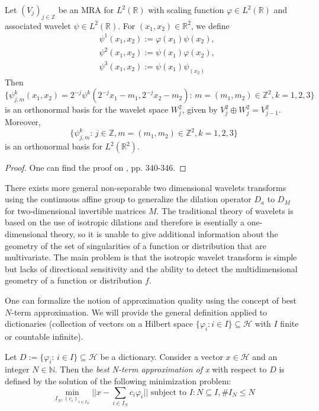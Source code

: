 \begin{thm}
Let $(V_j)_{j\in\mathbb{Z}}$ be an MRA for $L^2(\mathbb{R})$ with scaling function $\varphi\in L^2(\mathbb{R})$ and associated wavelet $\psi\in L^2(\mathbb{R})$. For $(x_1,x_2)\in\mathbb{R}^2$, we define
$$
\begin{aligned}
&\psi^1(x_1,x_2):=\varphi(x_1)\psi(x_2),\\
&\psi^2(x_1,x_2):=\psi(x_1)\varphi(x_2),\\
&\psi^3(x_1,x_2):=\psi(x_1)\psi_(x_2)
\end{aligned}
$$
Then 
$$
\{\psi_{j,m}^k(x_1,x_2)=2^{-j}\psi^k(2^{-j}x_1-m_1,2^{-j}x_2-m_2)\text{: } m=(m_1,m_2)\in\mathbb{Z}^2,k=1,2,3\}
$$
is an orthonormal basis for the wavelet space $W^2_j$, given by $V^2_j\oplus W^2_j=V^2_{j-1}$. Moreover,
$$
\{\psi_{j,m}^k\text{:  }j\in\mathbb{Z},m=(m_1,m_2)\in\mathbb{Z}^2,k=1,2,3\}
$$
is an orthonormal basis for $L^2(\mathbb{R}^2)$.
\end{thm}
\begin{proof}
One can find the proof on \cite{Mallat}, pp. 340-346.
\end{proof}

\bigskip

There exists more general non-separable two dimensional wavelets transforms using the continuous affine group to generalize the dilation operator $D_a$ to $D_M$ for two-dimensional invertible matrices $M$. The traditional theory of wavelets is based on the use of isotropic dilations and therefore is esentially a one-dimensional theory, so it is unable to give additional information about the geometry of the set of singularities of a function or distribution that are multivariate. The main problem is that the isotropic wavelet transform is simple but lacks of directional sensitivity and the ability to detect the multidimensional geometry of a function or distribution $f$.

\bigskip

One can formalize the notion of approximation quality using the concept of best $N$-term approximation. We will provide the general definition applied to dictionaries (collection of vectors on a Hilbert space $\{\varphi_i: i\in I\}\subseteq \mathcal{H}$ with $I$ finite or countable infinite).

\bigskip

\begin{defn}
Let $D:=\{\varphi_i\text{:  }i\in I\}\subseteq \mathcal{H}$ be a dictionary. Consider a vector $x\in\mathcal{H}$ and an integer $N\in\mathbb{N}$. Then the \textit{best N-term approximation of x} with respect to $D$ is defined by the solution of the following minimization problem:
$$
\min_{I_N,(c_i)_{i\in I_N}}||x-\sum_{i\in I_N} c_i\varphi_i|| \text{ subject to } I:N\subseteq I,\# I_N\leq N
$$
\end{defn}

